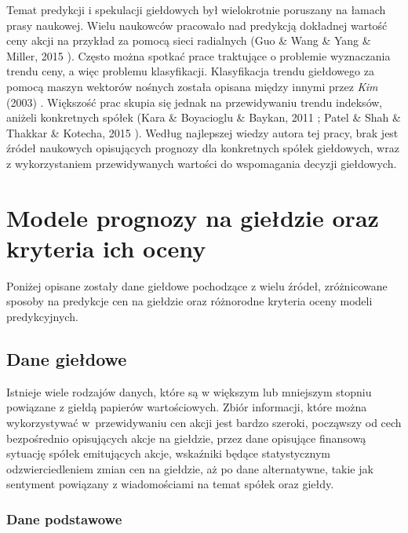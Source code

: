 \documentclass[a4paper, twoside, 11pt, openright]{article}
\begin{document}
\bigskip

Temat predykcji i spekulacji giełdowych był wielokrotnie poruszany na łamach prasy naukowej. Wielu naukowców pracowało nad predykcją dokładnej wartość ceny akcji na przykład za pomocą sieci radialnych (Guo \& Wang \& Yang \& Miller, 2015 \cite{paper_regression_radial}). Często można spotkać prace traktujące o problemie wyznaczania trendu ceny, a więc problemu klasyfikacji. Klasyfikacja trendu giełdowego za pomocą maszyn wektorów nośnych została opisana między innymi przez \textit{Kim} (2003) \cite{paper_classification_svm}. Większość prac skupia się jednak na przewidywaniu trendu indeksów, aniżeli konkretnych spółek (Kara \& Boyacioglu \& Baykan, 2011 \cite{paper_classification_index_istanbul}; Patel \& Shah \& Thakkar \& Kotecha, 2015 \cite{paper_classification_index_sp500}). Według najlepszej wiedzy autora tej pracy, brak jest źródeł naukowych opisujących prognozy dla konkretnych spółek giełdowych, wraz z wykorzystaniem przewidywanych wartości do wspomagania decyzji giełdowych. 

\newpage

\section{Modele prognozy na giełdzie oraz kryteria ich oceny}

Poniżej opisane zostały dane giełdowe pochodzące z wielu źródeł, zróżnicowane sposoby na predykcje cen na giełdzie oraz różnorodne kryteria oceny modeli predykcyjnych. 

\subsection{Dane giełdowe}

Istnieje wiele rodzajów danych, które są w większym lub mniejszym stopniu powiązane z giełdą papierów wartościowych. Zbiór informacji, które można wykorzystywać w~przewidywaniu cen akcji jest bardzo szeroki, począwszy od cech bezpośrednio opisujących akcje na giełdzie, przez dane opisujące finansową sytuację spółek emitujących akcje, wskaźniki będące statystycznym odzwierciedleniem zmian cen na giełdzie, aż po dane alternatywne, takie jak sentyment powiązany z wiadomościami na temat spółek oraz giełdy.

\subsubsection{Dane podstawowe}
\end{document}
